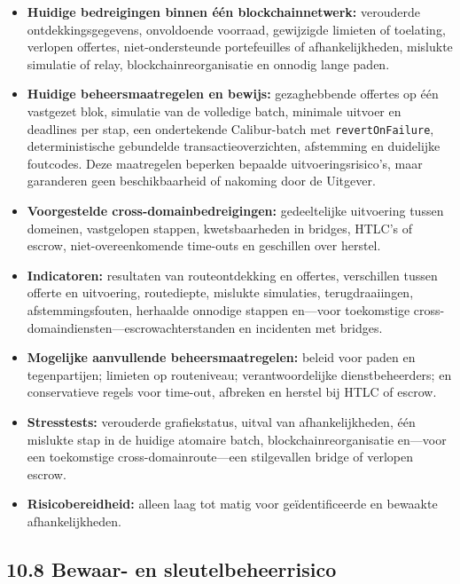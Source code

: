 \documentclass[11pt]{article}
\begin{document}
\begin{itemize}[leftmargin=*]
\item \textbf{Huidige bedreigingen binnen één blockchainnetwerk:} verouderde ontdekkingsgegevens, onvoldoende voorraad, gewijzigde limieten of toelating, verlopen offertes, niet-ondersteunde portefeuilles of afhankelijkheden, mislukte simulatie of relay, blockchainreorganisatie en onnodig lange paden.
\item \textbf{Huidige beheersmaatregelen en bewijs:} gezaghebbende offertes op één vastgezet blok, simulatie van de volledige batch, minimale uitvoer en deadlines per stap, een ondertekende Calibur-batch met \texttt{revertOnFailure}, deterministische gebundelde transactieoverzichten, afstemming en duidelijke foutcodes. Deze maatregelen beperken bepaalde uitvoeringsrisico's, maar garanderen geen beschikbaarheid of nakoming door de Uitgever.
\item \textbf{Voorgestelde cross-domainbedreigingen:} gedeeltelijke uitvoering tussen domeinen, vastgelopen stappen, kwetsbaarheden in bridges, HTLC's of escrow, niet-overeenkomende time-outs en geschillen over herstel.
\item \textbf{Indicatoren:} resultaten van routeontdekking en offertes, verschillen tussen offerte en uitvoering, routediepte, mislukte simulaties, terugdraaiingen, afstemmingsfouten, herhaalde onnodige stappen en---voor toekomstige cross-domaindiensten---escrowachterstanden en incidenten met bridges.
\item \textbf{Mogelijke aanvullende beheersmaatregelen:} beleid voor paden en tegenpartijen; limieten op routeniveau; verantwoordelijke dienstbeheerders; en conservatieve regels voor time-out, afbreken en herstel bij HTLC of escrow.
\item \textbf{Stresstests:} verouderde grafiekstatus, uitval van afhankelijkheden, één mislukte stap in de huidige atomaire batch, blockchainreorganisatie en---voor een toekomstige cross-domainroute---een stilgevallen bridge of verlopen escrow.
\item \textbf{Risicobereidheid:} alleen laag tot matig voor geïdentificeerde en bewaakte afhankelijkheden.
\end{itemize}
\subsection*{10.8 Bewaar- en sleutelbeheerrisico}
\end{document}
